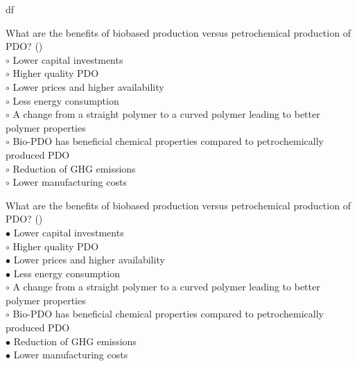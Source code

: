 df\documentclass[]{beamer}
\begin{document}
\begin{CJK}{UTF8}{gbsn}
\begin{frame}[shrink] {}
\addtocounter{questions}{1}
\color{blue}
What are the benefits of biobased production versus petrochemical production of PDO?
({})\\
\color{black}
\setlength{\parindent}{-0.4cm}
{\color{red}$\circ$}  Lower capital investments  \\
{\color{red}$\circ$} Higher quality PDO   \\
{\color{red}$\circ$}  Lower prices and higher availability  \\
{\color{red}$\circ$}  Less energy consumption  \\
{\color{red}$\circ$} A change from a straight polymer to a curved polymer leading to better polymer properties  \\
{\color{red}$\circ$} Bio-PDO has beneficial chemical properties compared to petrochemically produced PDO  \\
{\color{red}$\circ$}  Reduction of GHG emissions  \\
{\color{red}$\circ$}  Lower manufacturing costs  \\
\end{frame}
\begin{frame}[shrink] {}
\addtocounter{answers}{1}
\color{blue}
What are the benefits of biobased production versus petrochemical production of PDO?
({})\\
\color{black}
\setlength{\parindent}{-0.4cm}
{\color{red}$\bullet$} Lower capital investments  \\
{\color{red}$\circ$} Higher quality PDO   \\
{\color{red}$\bullet$} Lower prices and higher availability  \\
{\color{red}$\bullet$} Less energy consumption  \\
{\color{red}$\circ$} A change from a straight polymer to a curved polymer leading to better polymer properties  \\
{\color{red}$\circ$} Bio-PDO has beneficial chemical properties compared to petrochemically produced PDO  \\
{\color{red}$\bullet$} Reduction of GHG emissions  \\
{\color{red}$\bullet$} Lower manufacturing costs  \\
\end{frame}



\end{CJK}
\end{document}
